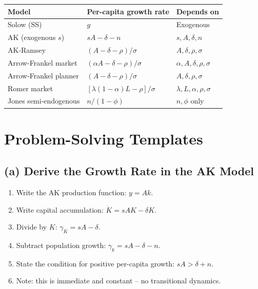 \documentclass[a4paper,11pt]{article}
\begin{document}
\begin{center}
\begin{tabular}{lll}
\toprule
\textbf{Model} & \textbf{Per-capita growth rate} & \textbf{Depends on} \\
\midrule
Solow (SS) & $g$ & Exogenous \\
AK (exogenous $s$) & $sA - \delta - n$ & $s, A, \delta, n$ \\
AK-Ramsey & $(A - \delta - \rho)/\sigma$ & $A, \delta, \rho, \sigma$ \\
Arrow-Frankel market & $(\alpha A - \delta - \rho)/\sigma$ & $\alpha, A, \delta, \rho, \sigma$ \\
Arrow-Frankel planner & $(A - \delta - \rho)/\sigma$ & $A, \delta, \rho, \sigma$ \\
Romer market & $[\lambda(1-\alpha)L - \rho]/\sigma$ & $\lambda, L, \alpha, \rho, \sigma$ \\
Jones semi-endogenous & $n/(1-\phi)$ & $n, \phi$ only \\
\bottomrule
\end{tabular}
\end{center}

\clearpage

\section{Problem-Solving Templates}

\subsection*{(a) Derive the Growth Rate in the AK Model}

\begin{enumerate}
    \item Write the AK production function: $y = Ak$.
    \item Write capital accumulation: $\dot{K} = sAK - \delta K$.
    \item Divide by $K$: $\gamma_K = sA - \delta$.
    \item Subtract population growth: $\gamma_k = sA - \delta - n$.
    \item State the condition for positive per-capita growth: $sA > \delta + n$.
    \item Note: this is immediate and constant -- no transitional dynamics.
\end{enumerate}
\end{document}
